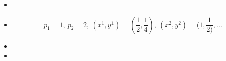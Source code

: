 \documentclass[11pt]{article}
\begin{document}
\begin{itemize}
\item
\item
\begin{equation}
p_1 = 1, \ p_2 = 2, \ (x^1, y^1) = (\frac{1}{2}, \frac{1}{4}), \ (x^2, y^2) = (1, \frac{1}{2)},...
\end{equation}
\item
\item
\end{itemize}
\end{document}
